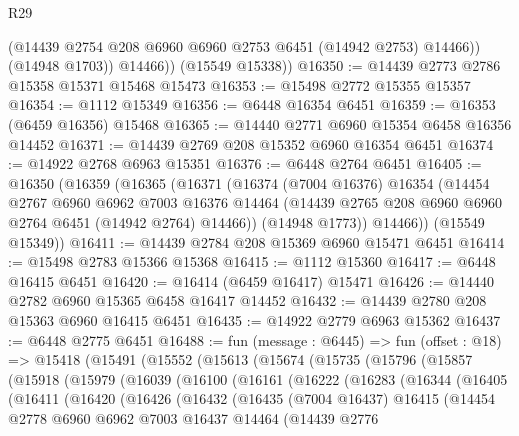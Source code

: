 \begin{lexlean}{R29}
\begin{coremodule}
              (@14439 @2754 @208 @6960 @6960 @2753 @6451 (@14942 @2753) @14466))
            (@14948 @1703))
          @14466))
      (@15549 @15338))
@16350 := @14439 @2773 @2786 @15358 @15371 @15468 @15473
@16353 := @15498 @2772 @15355 @15357
@16354 := @1112 @15349
@16356 := @6448 @16354 @6451
@16359 := @16353 (@6459 @16356) @15468
@16365 := @14440 @2771 @6960 @15354 @6458 @16356 @14452
@16371 := @14439 @2769 @208 @15352 @6960 @16354 @6451
@16374 := @14922 @2768 @6963 @15351
@16376 := @6448 @2764 @6451
@16405 := @16350
    (@16359
      (@16365
        (@16371
          (@16374
            (@7004 @16376)
            @16354
            (@14454
              @2767
              @6960
              @6962
              @7003
              @16376
              @14464
              (@14439 @2765 @208 @6960 @6960 @2764 @6451 (@14942 @2764) @14466))
            (@14948 @1773))
          @14466))
      (@15549 @15349))
@16411 := @14439 @2784 @208 @15369 @6960 @15471 @6451
@16414 := @15498 @2783 @15366 @15368
@16415 := @1112 @15360
@16417 := @6448 @16415 @6451
@16420 := @16414 (@6459 @16417) @15471
@16426 := @14440 @2782 @6960 @15365 @6458 @16417 @14452
@16432 := @14439 @2780 @208 @15363 @6960 @16415 @6451
@16435 := @14922 @2779 @6963 @15362
@16437 := @6448 @2775 @6451
@16488 := fun (message : @6445) =>
  fun (offset : @18) =>
  @15418
    (@15491
      (@15552
        (@15613
          (@15674
            (@15735
              (@15796
                (@15857
                  (@15918
                    (@15979
                      (@16039
                        (@16100
                          (@16161
                            (@16222
                              (@16283
                                (@16344
                                  (@16405
                                    (@16411
                                      (@16420
                                        (@16426
                                          (@16432
                                            (@16435
                                              (@7004 @16437)
                                              @16415
                                              (@14454
                                                @2778
                                                @6960
                                                @6962
                                                @7003
                                                @16437
                                                @14464
                                                (@14439
                                                  @2776

\end{coremodule}
\end{lexlean}
